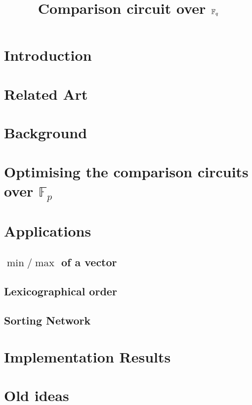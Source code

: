 \documentclass{llncs}
\title{Comparison circuit over $\mathbb{F}_q$}
\date{}
\author{}
\begin{document}
\maketitle

\section{Introduction}
\label{sec:introduction}




\section{Related Art}
\label{sec:related-art}



\section{Background}
\label{sec:background}


% 

\section{Optimising the comparison circuits over $\mathbb{F}_p$}
\label{sec:comparison-circuit}



\section{Applications}
\label{sec:applications}

\subsection{$\min/\max$ of a vector}
\label{sec:min/max}

\subsection{Lexicographical order}
\label{sec:lexic-order}

\subsection{Sorting Network}
\label{sec:sorting-network}


\section{Implementation Results}
\label{sec:impl-results}


\section{Old ideas}




\end{document}
